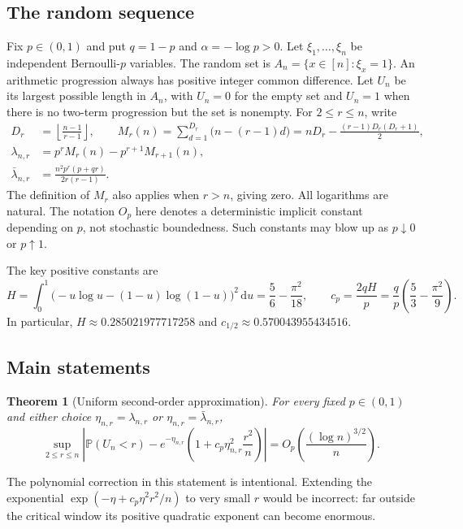 \documentclass[11pt]{article}
\newtheorem{theorem}{Theorem}[section]
\theoremstyle{definition}\newtheorem{definition}[theorem]{Definition}
\theoremstyle{remark}\newtheorem{remark}[theorem]{Remark}
\newcommand{\PP}{\mathbb P}
\newcommand{\la}{\lambda}
\newcommand{\dd}{\,\mathrm d}
\begin{document}
\subsection{The random sequence}
Fix $p\in(0,1)$ and put $q=1-p$ and $\alpha=-\log p>0$.
Let $\xi_1,\ldots,\xi_n$ be independent Bernoulli-$p$ variables.
The random set is $A_n=\{x\in[n]:\xi_x=1\}$. An arithmetic progression
always has positive integer common difference. Let $U_n$ be its largest
possible length in $A_n$, with $U_n=0$ for the empty set and $U_n=1$
when there is no two-term progression but the set is nonempty.
For $2\le r\le n$, write
\begin{align}
 D_r&=\left\lfloor\frac{n-1}{r-1}\right\rfloor,\qquad
 M_r(n)=\sum_{d=1}^{D_r}\bigl(n-(r-1)d\bigr)
       =nD_r-\frac{(r-1)D_r(D_r+1)}2,\label{eq:M}\\
 \la_{n,r}&=p^rM_r(n)-p^{r+1}M_{r+1}(n),\label{eq:lambda}\\
 \bar\la_{n,r}&=\frac{n^2p^r(p+qr)}{2r(r-1)}.\label{eq:barlambda}
\end{align}
The definition of $M_r$ also applies when $r>n$, giving zero.
All logarithms are natural. The notation $O_p$ here denotes a deterministic
implicit constant depending on $p$, not stochastic boundedness. Such constants may
blow up as $p\downarrow0$ or $p\uparrow1$.

The key positive constants are
\begin{equation}
 H=\int_0^1\bigl(-u\log u-(1-u)\log(1-u)\bigr)^2\dd u
   =\frac56-\frac{\pi^2}{18},\qquad
 c_p=\frac{2qH}{p}=\frac qp\left(\frac53-\frac{\pi^2}{9}\right).
 \label{eq:constants}
\end{equation}
In particular, $H\approx0.285021977717258$ and
$c_{1/2}\approx0.570043955434516$.

\subsection{Main statements}
\begin{theorem}[Uniform second-order approximation]\label{thm:uniform}
For every fixed $p\in(0,1)$ and either choice
$\eta_{n,r}=\la_{n,r}$ or $\eta_{n,r}=\bar\la_{n,r}$,
\begin{equation}
 \sup_{2\le r\le n}\left|
 \PP(U_n<r)-e^{-\eta_{n,r}}
 \left(1+c_p\eta_{n,r}^2\frac{r^2}{n}\right)\right|
 =O_p\!\left(\frac{(\log n)^{3/2}}{n}\right).
 \label{eq:uniformcorrected}
\end{equation}
\end{theorem}
The polynomial correction in this statement is intentional. Extending the
exponential $\exp(-\eta+c_p\eta^2r^2/n)$ to very small $r$ would be
incorrect: far outside the critical window its positive quadratic
exponent can become enormous.
\end{document}
